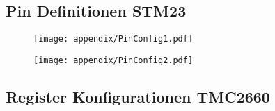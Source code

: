 \begin{appendix}
\subsection{Pin Definitionen STM23}
\label{app:PinDef_STM32}
\vspace{5mm}
\begin{figure}[h]
	\centering
	\texttt{[image: appendix/PinConfig1.pdf]}
\end{figure}
\begin{figure}[h]
	\centering
	\texttt{[image: appendix/PinConfig2.pdf]}
\end{figure}

\clearpage

\subsection{Register Konfigurationen TMC2660}
\label{app:RegisterKonfigTMC} 


\end{appendix}
